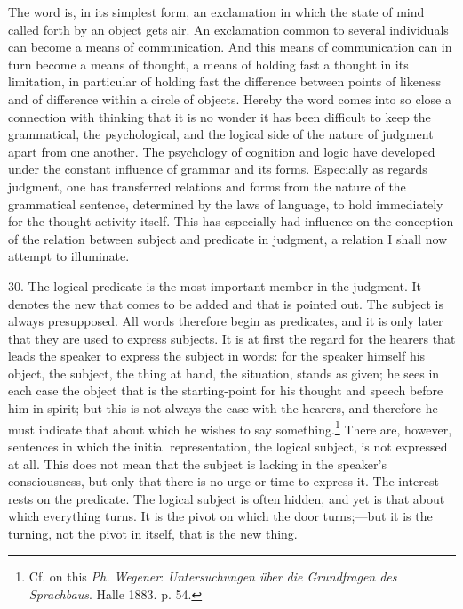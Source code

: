 \documentclass[12pt,a4paper]{book}
\newcommand{\opage}[1]{\marginnote{\footnotesize\textit{[#1]}}}
\begin{document}
The word is, in its simplest form, an exclamation in which the state of
mind called forth by an object gets air. An exclamation common to several
individuals can become a means of communication. And this means of
communication can in turn become a means of thought, a means of holding
fast a thought in its limitation, in particular of holding fast the
difference between points of likeness and of difference within a circle of
objects. Hereby the word comes into so close a connection with thinking
that it is no wonder it has been difficult to keep the grammatical, the
psychological, and the logical side of the nature of judgment apart from
one another. The psychology of cognition and logic have developed under
the constant influence of grammar and its forms. Especially as regards
judgment, one has transferred relations and forms from the nature of the
grammatical sentence, determined by the laws of \opage{84}language, to hold
immediately for the thought-activity itself. This has especially had
influence on the conception of the relation between subject and predicate
in judgment, a relation I shall now attempt to illuminate.

30. The logical predicate is the most important member in the judgment. It
denotes the new that comes to be added and that is pointed out. The
subject is always presupposed. All words therefore begin as predicates,
and it is only later that they are used to express subjects. It is at first
the regard for the hearers that leads the speaker to express the subject
in words: for the speaker himself his object, the subject, the thing at
hand, the situation, stands as given; he sees in each case the object that
is the starting-point for his thought and speech before him in spirit; but
this is not always the case with the hearers, and therefore he must
indicate that about which he wishes to say something.\footnote{Cf. on this
\emph{Ph. Wegener}: \emph{Untersuchungen über die Grundfragen des
Sprachbaus}. Halle 1883. p. 54.} There are, however, sentences in which
the initial representation, the logical subject, is not expressed at all.
This does not mean that the subject is lacking in the speaker's
consciousness, but only that there is no urge or time to express it. The
interest rests on the predicate. The logical subject is often hidden, and
yet is that about which everything turns. It is the pivot on which the
door turns;---but it is the turning, not the pivot in itself, that is the
new thing.
\end{document}
